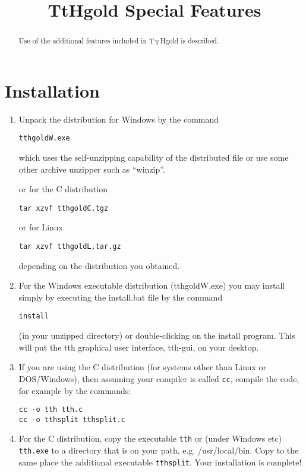 \documentclass[12pt]{article}
\def\tth{T$_{\rm T}$H}
\begin{document}
\title{TtHgold Special Features}
\author{}\date{}
\maketitle
\tableofcontents

\begin{abstract}
Use of the additional features included in \tth{}gold is described.
\end{abstract}

\section{Installation}

\begin{enumerate}

\item
Unpack the distribution for Windows by the command 
\begin{verbatim}
tthgoldW.exe
\end{verbatim}
which uses the self-unzipping capability of the distributed file
or use some other archive unzipper such as ``winzip''.

or for the C distribution
\begin{verbatim}
tar xzvf tthgoldC.tgz
\end{verbatim}

or for Linux
\begin{verbatim}
tar xzvf tthgoldL.tar.gz
\end{verbatim}

depending on the distribution you obtained.

\item For the Windows executable distribution (tthgoldW.exe) you
may install simply by executing the install.bat file by the command
\begin{verbatim}
install 
\end{verbatim}
(in your unzipped directory) or double-clicking on the install
program. This will put the tth graphical user interface, tth-gui, on
your desktop.

\item If you are using the C
distribution (for systems other than Linux or DOS/Windows), then
assuming your compiler is called \verb!cc!, compile the code, for
example by the commands:
\begin{verbatim}
cc -o tth tth.c
cc -o tthsplit tthsplit.c
\end{verbatim}

\item For the C distribution, copy the executable \verb!tth! or (under
Windows etc) \verb!tth.exe! to a directory that is on your path,
e.g. /usr/local/bin. Copy to the same place the additional executable
\verb!tthsplit!. Your installation is complete!

\end{enumerate}
\end{document}
